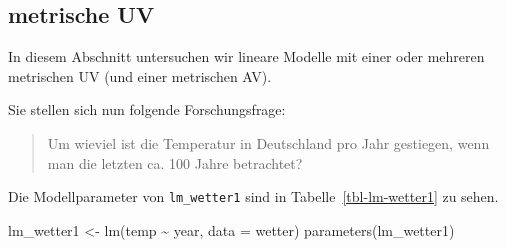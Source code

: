 \documentclass[
  letterpaper,
  twoside,
  open=any]{scrbook}
\newenvironment{Shaded}{\begin{snugshade}}{\end{snugshade}}
\newcommand{\AttributeTok}[1]{\textcolor[rgb]{0.40,0.45,0.13}{#1}}
\newcommand{\FunctionTok}[1]{\textcolor[rgb]{0.28,0.35,0.67}{#1}}
\newcommand{\NormalTok}[1]{\textcolor[rgb]{0.00,0.23,0.31}{#1}}
\newcommand{\OtherTok}[1]{\textcolor[rgb]{0.00,0.23,0.31}{#1}}
\newcommand{\SpecialCharTok}[1]{\textcolor[rgb]{0.37,0.37,0.37}{#1}}
\theoremstyle{definition}
\theoremstyle{definition}
\theoremstyle{definition}
\theoremstyle{remark}
\begin{document}
\subsection{metrische UV}\label{metrische-uv}

In diesem Abschnitt untersuchen wir lineare Modelle mit einer oder
mehreren metrischen UV (und einer metrischen AV).

Sie stellen sich nun folgende Forschungsfrage:

\begin{quote}
{} Um wieviel ist die Temperatur in Deutschland pro Jahr
gestiegen, wenn man die letzten ca. 100 Jahre betrachtet?
\end{quote}

Die Modellparameter von \texttt{lm\_wetter1} sind in
Tabelle~\ref{tbl-lm-wetter1} zu sehen.

\begin{Shaded}
\begin{Highlighting}[]
\NormalTok{lm\_wetter1 }\OtherTok{\textless{}{-}} \FunctionTok{lm}\NormalTok{(temp }\SpecialCharTok{\textasciitilde{}}\NormalTok{ year, }\AttributeTok{data =}\NormalTok{ wetter)}
\FunctionTok{parameters}\NormalTok{(lm\_wetter1)}
\end{Highlighting}
\end{Shaded}
\end{document}
